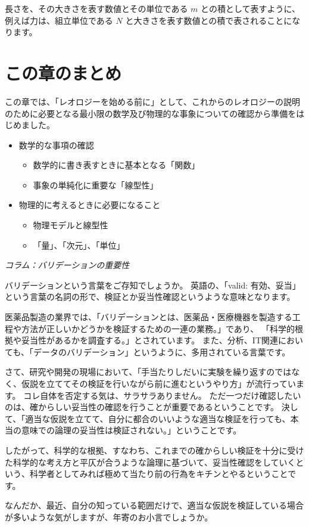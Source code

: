 \documentclass[uplatex,dvipdfmx,a4paper,11pt]{jsarticle}
\begin{document}
長さを、その大きさを表す数値とその単位である $m$ との積として表すように、例えば力は、組立単位である $N$ と大きさを表す数値との積で表されることになります。

\section*{この章のまとめ}

この章では、「レオロジーを始める前に」として、これからのレオロジーの説明のために必要となる最小限の数学及び物理的な事象についての確認から準備をはじめました。
\begin{boxnote}
	\large
	\begin{itemize}
		\item 数学的な事項の確認
		\begin{itemize}
			\item 数学的に書き表すときに基本となる「関数」
			\item 事象の単純化に重要な「線型性」
		\end{itemize}
		\item 物理的に考えるときに必要になること
		\begin{itemize}
			\item 物理モデルと線型性
			\item 「量」、「次元」、「単位」
		\end{itemize}
	\end{itemize} 
\end{boxnote}

\newpage

\begin{longartdeco}
	\begin{center}
	\emph{コラム：バリデーションの重要性}	
	\end{center}

	バリデーションという言葉をご存知でしょうか。
	英語の、「valid: 有効、妥当」という言葉の名詞の形で、検証とか妥当性確認というような意味となります。
	
	医薬品製造の業界では、「バリデーションとは、医薬品・医療機器を製造する工程や方法が正しいかどうかを検証するための一連の業務。」であり、
	「科学的根拠や妥当性があるかを調査する。」とされています。
	また、分析、IT関連においても、「データのバリデーション」というように、多用されている言葉です。
	
	さて、研究や開発の現場において、「手当たりしだいに実験を繰り返すのではなく、仮説を立ててその検証を行いながら前に進むというやり方」が流行っています。
	コレ自体を否定する気は、サラサラありません。
	ただ一つだけ確認したいのは、確からしい妥当性の確認を行うことが重要であるということです。
	決して、「適当な仮説を立てて、自分に都合のいいような適当な検証を行っても、本当の意味での論理の妥当性は検証されない。」ということです。
	
	したがって、科学的な根拠、すなわち、これまでの確からしい検証を十分に受けた科学的な考え方と平仄が合うような論理に基づいて、妥当性確認をしていくという、科学者としてみれば極めて当たり前の行為をキチンとやるということです。
	
	なんだか、最近、自分の知っている範囲だけで、適当な仮説を検証している場合が多いような気がしますが、年寄のお小言でしょうか。

\end{longartdeco}
\end{document}
